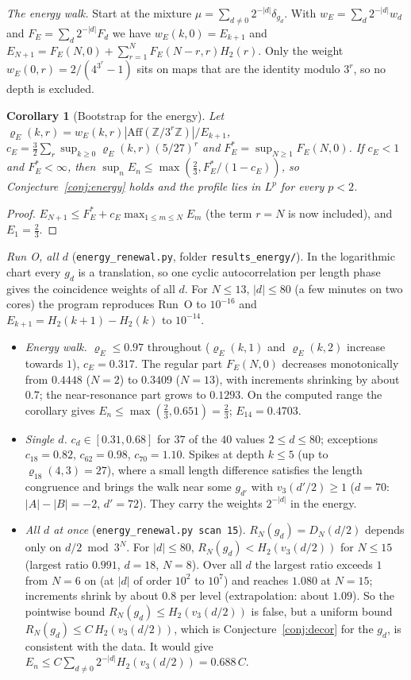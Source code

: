 \documentclass[11pt]{article}
\newtheorem{corollary}[theorem]{Corollary}
\theoremstyle{remark}
\newcommand{\Z}{\mathbb Z}
\begin{document}
\emph{The energy walk.} Start at the mixture $\mu=\sum_{d\ne0}2^{-|d|}\delta_{g_d}$. With $w_E=\sum_d2^{-|d|}w_d$ and $F_E=\sum_d2^{-|d|}F_d$ we have $w_E(k,0)=E_{k+1}$ and $E_{N+1}=F_E(N,0)+\sum_{r=1}^NF_E(N-r,r)H_2(r)$. Only the weight $w_E(0,r)=2/(4^{3^r}-1)$ sits on maps that are the identity modulo $3^r$, so no depth is excluded.

\begin{corollary}[Bootstrap for the energy]\label{cor:bootstrap-energy}
Let $\varrho_E(k,r)=w_E(k,r)|\mathrm{Aff}(\Z/3^r\Z)|/E_{k+1}$, $c_E=\frac32\sum_r\sup_{k\ge0}\varrho_E(k,r)(5/27)^r$ and $F^*_E=\sup_{N\ge1}F_E(N,0)$. If $c_E<1$ and $F^*_E<\infty$, then $\sup_nE_n\le\max(\frac23,F^*_E/(1-c_E))$, so Conjecture~\ref{conj:energy} holds and the profile lies in $L^p$ for every $p<2$.
\end{corollary}

\begin{proof}
$E_{N+1}\le F^*_E+c_E\max_{1\le m\le N}E_m$ (the term $r=N$ is now included), and $E_1=\frac23$.
\end{proof}

\emph{Run O, all $d$} (\texttt{energy\_renewal.py}, folder \texttt{results\_energy/}). In the logarithmic chart every $g_d$ is a translation, so one cyclic autocorrelation per length phase gives the coincidence weights of all $d$. For $N\le13$, $|d|\le80$ (a few minutes on two cores) the program reproduces Run~O to $10^{-16}$ and $E_{k+1}=H_2(k+1)-H_2(k)$ to $10^{-14}$.
\begin{itemize}
\item \emph{Energy walk.} $\varrho_E\le0.97$ throughout ($\varrho_E(k,1)$ and $\varrho_E(k,2)$ increase towards $1$), $c_E=0.317$. The regular part $F_E(N,0)$ decreases monotonically from $0.4448$ ($N=2$) to $0.3409$ ($N=13$), with increments shrinking by about $0.7$; the near-resonance part grows to $0.1293$. On the computed range the corollary gives $E_n\le\max(\frac23,0.651)=\frac23$; $E_{14}=0.4703$.
\item \emph{Single $d$.} $c_d\in[0.31,0.68]$ for $37$ of the $40$ values $2\le d\le80$; exceptions $c_{18}=0.82$, $c_{62}=0.98$, $c_{70}=1.10$. Spikes at depth $k\le5$ (up to $\varrho_{18}(4,3)=27$), where a small length difference satisfies the length congruence and brings the walk near some $g_{d'}$ with $v_3(d'/2)\ge1$ ($d=70$: $|A|-|B|=-2$, $d'=72$). They carry the weights $2^{-|d|}$ in the energy.
\item \emph{All $d$ at once} (\texttt{energy\_renewal.py scan 15}). $R_N(g_d)=D_N(d/2)$ depends only on $d/2\bmod3^N$. For $|d|\le80$, $R_N(g_d)<H_2(v_3(d/2))$ for $N\le15$ (largest ratio $0.991$, $d=18$, $N=8$). Over all $d$ the largest ratio exceeds $1$ from $N=6$ on (at $|d|$ of order $10^2$ to $10^7$) and reaches $1.080$ at $N=15$; increments shrink by about $0.8$ per level (extrapolation: about $1.09$). So the pointwise bound $R_N(g_d)\le H_2(v_3(d/2))$ is false, but a uniform bound $R_N(g_d)\le C\,H_2(v_3(d/2))$, which is Conjecture~\ref{conj:decor} for the $g_d$, is consistent with the data. It would give $E_n\le C\sum_{d\ne0}2^{-|d|}H_2(v_3(d/2))=0.688\,C$.
\end{itemize}
\end{document}
